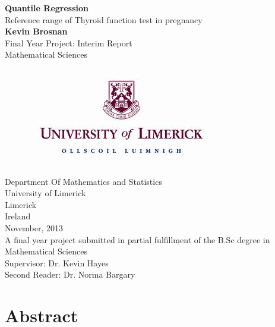 \documentclass[12pt,a4paper]{report}
\begin{document}
\begin{titlepage}
\vspace*{\fill}
\begin{center}
\Huge{\textbf{Quantile Regression}}\\
\Large{Reference range of Thyroid function test in pregnancy}\\
\vspace{5mm}
\Large{\textbf{Kevin Brosnan}}\\
\vspace{5mm}
\Large{Final Year Project: Interim Report}\\
\Large{Mathematical Sciences}\\
\vspace{5mm}
\begin{figure}[h]
\begin{center}
\includegraphics{ullogo.jpg}
\end{center}
\end{figure}
\Large{Department Of Mathematics and Statistics}\\
\Large{University of Limerick}\\
\Large{Limerick}\\
\Large{Ireland}\\
\Large{November, 2013}\\
\vspace{10mm}
\large{A final year project submitted in partial fulfillment of the B.Sc degree in Mathematical Sciences}\\
\vspace{6mm}
\Large{Supervisor: Dr. Kevin Hayes}\\
\Large{Second Reader: Dr. Norma Bargary}
\end{center}
\vspace*{\fill}
\end{titlepage}


\chapter*{Abstract}
\end{document}
